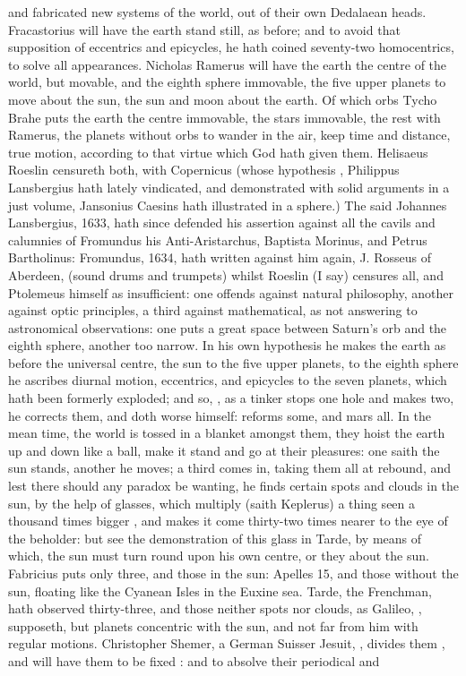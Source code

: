 {and fabricated new systems of the world, out of their own Dedalaean heads. Fracastorius will have the earth stand still, as before; and to avoid that supposition of eccentrics and epicycles, he hath coined seventy-two homocentrics, to solve all appearances. Nicholas Ramerus will have the earth the centre of the world, but movable, and the eighth sphere immovable, the five upper planets to move about the sun, the sun and moon about the earth. Of which orbs Tycho Brahe puts the earth the centre immovable, the stars immovable, the rest with Ramerus, the planets without orbs to wander in the air, keep time and distance, true motion, according to that virtue which God hath given them. Helisaeus Roeslin censureth both, with Copernicus (whose hypothesis , Philippus Lansbergius hath lately vindicated, and demonstrated with solid arguments in a just volume, Jansonius Caesins hath illustrated in a sphere.) The said Johannes Lansbergius, 1633, hath since defended his assertion against all the cavils and calumnies of Fromundus his Anti-Aristarchus, Baptista Morinus, and Petrus Bartholinus: Fromundus, 1634, hath written against him again, J. Rosseus of Aberdeen, \etc{} (sound drums and trumpets) whilst Roeslin (I say) censures all, and Ptolemeus himself as insufficient: one offends against natural philosophy, another against optic principles, a third against mathematical, as not answering to astronomical observations: one puts a great space between Saturn's orb and the eighth sphere, another too narrow. In his own hypothesis he makes the earth as before the universal centre, the sun to the five upper planets, to the eighth sphere he ascribes diurnal motion, eccentrics, and epicycles to the seven planets, which hath been formerly exploded; and so, , as a tinker stops one hole and makes two, he corrects them, and doth worse himself: reforms some, and mars all. In the mean time, the world is tossed in a blanket amongst them, they hoist the earth up and down like a ball, make it stand and go at their pleasures: one saith the sun stands, another he moves; a third comes in, taking them all at rebound, and lest there should any paradox be wanting, he finds certain spots and clouds in the sun, by the help of glasses, which multiply (saith Keplerus) a thing seen a thousand times bigger , and makes it come thirty-two times nearer to the eye of the beholder: but see the demonstration of this glass in Tarde, by means of which, the sun must turn round upon his own centre, or they about the sun. Fabricius puts only three, and those in the sun: Apelles 15, and those without the sun, floating like the Cyanean Isles in the Euxine sea. Tarde, the Frenchman, hath observed thirty-three, and those neither spots nor clouds, as Galileo, , supposeth, but planets concentric with the sun, and not far from him with regular motions. Christopher Shemer, a German Suisser Jesuit, , divides them , and will have them to be fixed : and to absolve their periodical and }
